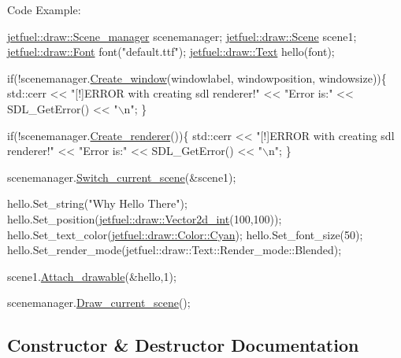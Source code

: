 Code Example\+: 
\begin{DoxyCode}
\hyperlink{classjetfuel_1_1draw_1_1Scene__manager}{jetfuel::draw::Scene\_manager} scenemanager;
\hyperlink{classjetfuel_1_1draw_1_1Scene}{jetfuel::draw::Scene} scene1;
\hyperlink{classjetfuel_1_1draw_1_1Font}{jetfuel::draw::Font} font(\textcolor{stringliteral}{"default.ttf"});
\hyperlink{classjetfuel_1_1draw_1_1Text}{jetfuel::draw::Text} hello(font);

\textcolor{keywordflow}{if}(!scenemanager.\hyperlink{classjetfuel_1_1draw_1_1Scene__manager_a5113e9062c272a22d383ba872417ba31}{Create\_window}(windowlabel,
                               windowposition,
                               windowsize))\{
    std::cerr << \textcolor{stringliteral}{"[!]ERROR with creating sdl renderer!"} <<
    \textcolor{stringliteral}{"Error is:"} << SDL\_GetError() << \textcolor{stringliteral}{"\(\backslash\)n"};
\}

\textcolor{keywordflow}{if}(!scenemanager.\hyperlink{classjetfuel_1_1draw_1_1Scene__manager_afafecd926ce5e4b2543a6d583a7d24b6}{Create\_renderer}())\{
    std::cerr << \textcolor{stringliteral}{"[!]ERROR with creating sdl renderer!"} <<
    \textcolor{stringliteral}{"Error is:"} << SDL\_GetError() << \textcolor{stringliteral}{"\(\backslash\)n"};
\}

scenemanager.\hyperlink{classjetfuel_1_1draw_1_1Scene__manager_a770c163b88ba8427539ee182315ea989}{Switch\_current\_scene}(&scene1);

hello.Set\_string(\textcolor{stringliteral}{"Why Hello There"});
hello.Set\_position(\hyperlink{classjetfuel_1_1draw_1_1Vector2d}{jetfuel::draw::Vector2d\_int}(100,100));
hello.Set\_text\_color(\hyperlink{classjetfuel_1_1draw_1_1Color_a9c9781b9377310494e8af2a5fe524ab4}{jetfuel::draw::Color::Cyan});
hello.Set\_font\_size(50);
hello.Set\_render\_mode(jetfuel::draw::Text::Render\_mode::Blended);

scene1.\hyperlink{classjetfuel_1_1draw_1_1Scene_aea4b4c4ae25c30d661be4c52787e0ea3}{Attach\_drawable}(&hello,1);

scenemanager.\hyperlink{classjetfuel_1_1draw_1_1Scene__manager_a8af9a3abfd5121b1b8556342de435773}{Draw\_current\_scene}();
\end{DoxyCode}
 

\subsection{Constructor \& Destructor Documentation}
\mbox{\label{classjetfuel_1_1draw_1_1Text_a8b6aed199242a7c69fda591d8769ced9}} 
